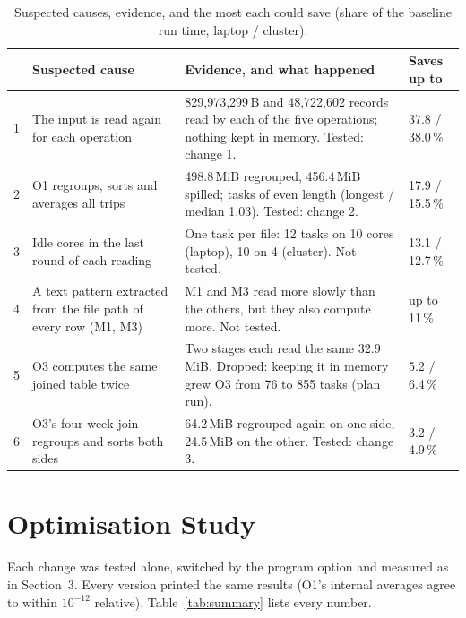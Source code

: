 \documentclass[sigconf]{acmart}
\newcommand{\mib}{\,MiB}
\begin{document}
\begin{table}[t]
\caption{Suspected causes, evidence, and the most each could save (share of the baseline run
time, laptop / cluster).}
\label{tab:causes}
\footnotesize
\begin{tabularx}{\textwidth}{@{}l>{\raggedright\arraybackslash}p{5.2cm}Xl@{}}
\toprule
 & Suspected cause & Evidence, and what happened & Saves up to \\
\midrule
1 & The input is read again for each operation & 829,973,299\,B and 48,722,602 records read by each of the five operations; nothing kept in memory. Tested: change 1. & 37.8 / 38.0\,\% \\
2 & O1 regroups, sorts and averages all trips & 498.8\mib{} regrouped, 456.4\mib{} spilled; tasks of even length (longest / median 1.03). Tested: change 2. & 17.9 / 15.5\,\% \\
3 & Idle cores in the last round of each reading & One task per file: 12 tasks on 10 cores (laptop), 10 on 4 (cluster). Not tested. & 13.1 / 12.7\,\% \\
4 & A text pattern extracted from the file path of every row (M1, M3) & M1 and M3 read more slowly than the others, but they also compute more. Not tested. & up to 11\,\% \\
5 & O3 computes the same joined table twice & Two stages each read the same 32.9\mib. Dropped: keeping it in memory grew O3 from 76 to 855 tasks (plan run). & 5.2 / 6.4\,\% \\
6 & O3's four-week join regroups and sorts both sides & 64.2\mib{} regrouped again on one side, 24.5\mib{} on the other. Tested: change 3. & 3.2 / 4.9\,\% \\
\bottomrule
\end{tabularx}
\end{table}

\section{Optimisation Study}

Each change was tested alone, switched by the program option and measured as in Section~3.
Every version printed the same results (O1's internal averages agree to within $10^{-12}$
relative). Table~\ref{tab:summary} lists every number.
\end{document}
